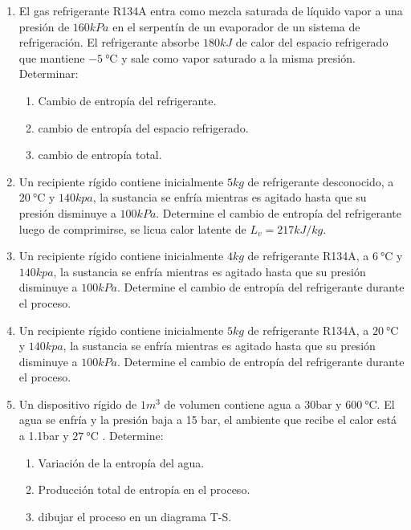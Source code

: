 \documentclass[../main]{subfiles}
\begin{document}
\begin{enumerate}
\begin{enumerate}
    \end{enumerate}
    \item El gas refrigerante R134A entra como mezcla saturada de líquido vapor a una presión de $160kPa$ en el serpentín de un evaporador de un sistema de refrigeración. El refrigerante absorbe $180kJ$ de calor del espacio refrigerado que mantiene $\SI{-5}{\celsius}$ y sale como vapor saturado a la misma presión. Determinar:
    \begin{enumerate}
        \item Cambio de entropía del refrigerante.
        \item cambio de entropía del espacio refrigerado.
        \item cambio de entropía total.
    \end{enumerate}
    
    \item Un recipiente rígido contiene inicialmente $5kg$ de refrigerante desconocido, a $\SI{20}{\celsius}$ y $140kpa$, la sustancia se enfría mientras es agitado hasta que su presión disminuye a $100kPa$. Determine el cambio de entropía del refrigerante luego de comprimirse, se licua calor latente de $L_v=217 kJ/kg$.
    
    
    \item Un recipiente rígido contiene inicialmente $4kg$ de refrigerante R134A, a $\SI{6}{\celsius}$ y $140kpa$, la sustancia se enfría mientras es agitado hasta que su presión disminuye a $100kPa$. Determine el cambio de entropía del refrigerante durante el proceso.
    
    
    \item Un recipiente rígido contiene inicialmente $5kg$ de refrigerante R134A, a $\SI{20}{\celsius}$ y $140kpa$, la sustancia se enfría mientras es agitado hasta que su presión disminuye a $100kPa$. Determine el cambio de entropía del refrigerante durante el proceso.
    
    
    
    \item Un dispositivo rígido de $ 1m^3$ de volumen contiene agua a 30bar y $\SI{600}{\celsius}$. El agua se enfría y la presión baja a 15 bar, el ambiente que recibe el calor está a 1.1bar y $\SI{27}{\celsius}$ . Determine:
    \begin{enumerate}
        \item Variación de la entropía del agua.
        \item Producción total de entropía en el proceso.
        \item dibujar el proceso en un diagrama T-S.
    \end{enumerate}
\end{enumerate}
\end{document}
